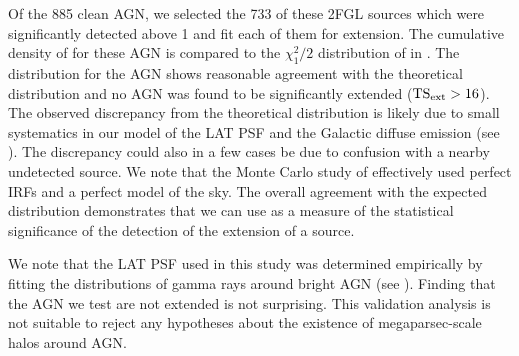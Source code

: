 Of the 885 clean AGN, we selected the 733 of these 2FGL sources which
were significantly detected above 1 \gev and fit each of them for
extension.  The cumulative density of \tsext for these AGN is compared
to the $\chi^2_1/2$ distribution of 
in .  The \tsext distribution
for the AGN shows reasonable agreement with the theoretical
distribution and no AGN was found to be significantly extended
($\mathrm{TS}_\mathrm{ext}>16$).  The observed discrepancy from the theoretical
distribution is likely due to small systematics
in our model of the LAT PSF and the Galactic diffuse emission (see
).  
The discrepancy could
also in a few cases be due to confusion with a nearby undetected source.
We note that the Monte Carlo study
of  effectively used perfect
IRFs and a perfect model of the sky.
The overall agreement with the expected distribution demonstrates that
we can use \tsext as a measure of the statistical significance of the
detection of the extension of a source.

We note that the LAT PSF used in this study was determined
empirically by fitting the distributions of gamma rays around bright AGN (see
). Finding that the AGN we
test are not extended is not surprising.  This validation analysis is
not suitable to reject any hypotheses about the existence of megaparsec-scale
halos around AGN.

